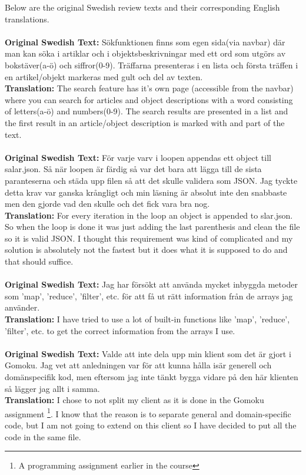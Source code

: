 \documentclass[twoside,twocolumn,a4paper,11pt,english]{article}
\begin{document}
Below are the original Swedish review texts and their corresponding English translations.
\\
\\
\textbf{Original Swedish Text:} Sökfunktionen finns som egen sida(via navbar) där man kan söka i artiklar och i objektsbeskrivningar med ett ord som utgörs av bokstäver(a-ö) och siffror(0-9). Träffarna presenteras i en lista och första träffen i en artikel/objekt markeras med gult och del av texten.
\\
\textbf{Translation:} The search feature has it's own page (accessible from the navbar) where you can search for articles and object descriptions with a word consisting of letters(a-ö) and numbers(0-9). The search results are presented in a list and the first result in an article/object description is marked with and part of the text.
\\
\\
\textbf{Original Swedish Text:} För varje varv i loopen appendas ett object till salar.json. Så när loopen är färdig så var det bara att lägga till de sista paranteserna och städa upp filen så att det skulle validera som JSON. Jag tyckte detta krav var ganska krångligt och min läsning är absolut inte den snabbaste men den gjorde vad den skulle och det fick vara bra nog.
\\
\textbf{Translation:} For every iteration in the loop an object is appended to slar.json. So when the loop is done it was just adding the last parenthesis and clean the file so it is valid JSON. I thought this requirement was kind of complicated and my solution is absolutely not the fastest but it does what it is supposed to do and that should suffice.
\\
\\
\textbf{Original Swedish Text:} Jag har försökt att använda mycket inbyggda metoder som 'map', 'reduce', 'filter', etc. för att få ut rätt information från de arrays jag använder.
\\
\textbf{Translation:} I have tried to use a lot of built-in functions like 'map', 'reduce', 'filter', etc. to get the correct information from the arrays I use.
\\
\\
\textbf{Original Swedish Text:} Valde att inte dela upp min klient som det är gjort i Gomoku. Jag vet att anledningen var för att kunna hålla isär generell och domänspecifik kod, men eftersom jag inte tänkt bygga vidare på den här klienten så lägger jag allt i samma.
\\
\textbf{Translation:} I chose to not split my client as it is done in the Gomoku assignment \footnote{A programming assignment earlier in the course}. I know that the reason is to separate general and domain-specific code, but I am not going to extend on this client so I have decided to put all the code in the same file.
\end{document}

